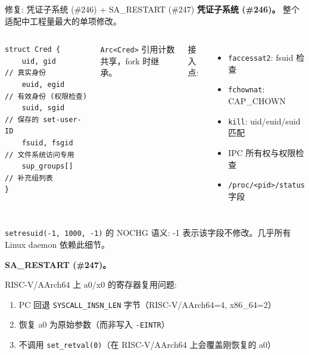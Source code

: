\documentclass[aspectratio=169,10pt]{ctexbeamer}
\begin{document}

\begin{frame}[fragile,shrink=30]{修复: 凭证子系统 (\#246) + SA\_RESTART (\#247)}
\textbf{凭证子系统 (\#246)。} 整个适配中工程量最大的单项修改。

\begin{columns}[T]
\small
\begin{verbatim}
struct Cred {
    uid, gid       // 真实身份
    euid, egid     // 有效身份 (权限检查)
    suid, sgid     // 保存的 set-user-ID
    fsuid, fsgid   // 文件系统访问专用
    sup_groups[]   // 补充组列表
}
\end{verbatim}
\small
\texttt{Arc<Cred>} 引用计数共享，fork 时继承。

接入点:
\begin{itemize}
  \item \texttt{faccessat2}: fsuid 检查
  \item \texttt{fchownat}: CAP\_CHOWN
  \item \texttt{kill}: uid/euid/suid 匹配
  \item IPC 所有权与权限检查
  \item \texttt{/proc/<pid>/status} 字段
\end{itemize}
\end{columns}

\vspace{1mm}
\texttt{setresuid(-1, 1000, -1)} 的 NOCHG 语义: -1 表示该字段不修改。几乎所有 Linux daemon 依赖此细节。

\vspace{1mm}
\textbf{SA\_RESTART (\#247)。}

RISC-V/AArch64 上 a0/x0 的寄存器复用问题:

\begin{enumerate}
  \item PC 回退 \texttt{SYSCALL\_INSN\_LEN} 字节（RISC-V/AArch64=4, x86\_64=2）
  \item 恢复 a0 为原始参数（而非写入 \texttt{-EINTR}）
  \item 不调用 \texttt{set\_retval(0)}（在 RISC-V/AArch64 上会覆盖刚恢复的 a0）
\end{enumerate}
\end{frame}

\end{document}
